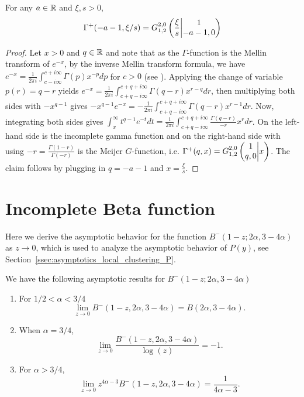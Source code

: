 \begin{appendices}
\begin{lemma}\label{lem:gamma_meijer_G}
For any $a\in \R$ and $\xi, s>0$,
$$\Gamma^+(-a-1,\xi/s) = \MeijerGnew{2}{0}{1}{2}{1}{-a-1,0}{\frac{\xi}{s}}$$
\end{lemma}
\begin{proof}
Let $x>0$ and $q\in\R$ and note that as the $\Gamma$-function is the Mellin transform of $e^{-x}$, by the inverse Mellin transform formula, we have $e^{-x}=\frac{1}{2\pi i}\int_{c-i\infty}^{c+i\infty} \Gamma(p)x^{-p}dp$ for $c>0$ (see \cite[p.196]{davies2012integral}). Applying the change of variable $p(r)=q-r$ yields $e^{-x}=\frac{1}{2\pi i}\int_{c+q-i\infty}^{c+q+i\infty} \Gamma(q-r) x^{r-q}dr$, then multiplying both sides with $-x^{q-1}$ gives $-x^{q-1}e^{-x} = -\frac{1}{2\pi i}\int_{c+q-i\infty}^{c+q+i\infty} \Gamma(q-r) x^{r-1}dr$. Now, integrating both sides gives $\int_x^\infty t^{q-1}e^{-t}dt = \frac{1}{2\pi i}\int_{c+q-i\infty}^{c+q+i\infty}\frac{\Gamma(q-r)}{-r}x^r dr$. On the left-hand side is the incomplete gamma function and on the right-hand side with using $-r= \frac{\Gamma(1-r)}{\Gamma(-r)}$ is the Meijer $G$-function, i.e. $\Gamma^+(q,x)=\MeijerG{2}{0}{1}{2}{1}{q,0}{x}$. The claim follows by plugging in $q=-a-1$ and $x=\frac{\xi}{s}$.
\end{proof}

\section{Incomplete Beta function}\label{sec:beta_function}

Here we derive the asymptotic behavior for the function $B^-(1-z; 2\alpha, 3-4\alpha )$ as $z \to 0$, which is used to analyze the asymptotic behavior of $P(y)$, see Section~\ref{ssec:asymptotics_local_clustering_P}.

\begin{lemma}\label{lem:asymptotics_incomplete_beta}
We have the following asymptotic results for $B^-(1-z; 2\alpha, 3-4\alpha )$
\begin{enumerate}
\item For $1/2 < \alpha < 3/4$
\[
	\lim_{z \to 0} B^-(1-z, 2\alpha, 3-4\alpha ) = B(2\alpha, 3 - 4\alpha).
\]
\item When $\alpha = 3/4$,
\[
	\lim_{z \to 0} \frac{B^-(1-z, 2\alpha, 3-4\alpha)}{\log(z)} = -1.
\]
\item For $\alpha > 3/4$,
\[
	\lim_{z \to 0} z^{4\alpha - 3} B^-(1-z, 2\alpha, 3-4\alpha ) = \frac{1}{4\alpha - 3}.
\]
\end{enumerate}
\end{lemma}


\end{appendices}
